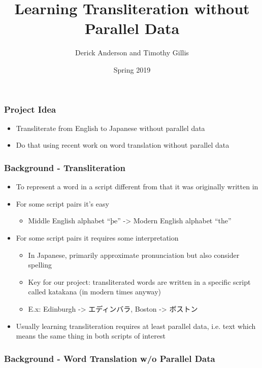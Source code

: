 \documentclass{beamer}
\title{Learning Transliteration without Parallel Data}
\author{Derick Anderson and Timothy Gillis}
\date{Spring 2019}
\begin{document}
 
\frame{\titlepage}
 
\begin{frame}
  \frametitle{Project Idea}

  \begin{itemize}
  \item Transliterate from English to Japanese without parallel data
  \item Do that using recent work on word translation without parallel data
  \end{itemize}

\end{frame}

\begin{frame}
  \frametitle{Background - Transliteration}

  \begin{itemize}
  \item To represent a word in a script different from that it was originally
    written in
  \item For some script pairs it's easy
    \begin{itemize}
      \item Middle English alphabet ``þe'' -> Modern English alphabet ``the''
    \end{itemize}

  \item For some script pairs it requires some interpretation
    \begin{itemize}
    \item In Japanese, primarily approximate pronunciation but also consider
      spelling
    \item Key for our project: transliterated words are written in a specific
      script called katakana (in modern times anyway)
    \item E.x: Edinburgh -> エディンバラ, Boston -> ボストン
    \end{itemize}

  \item Usually learning transliteration requires at least parallel data,
    i.e. text which means the same thing in both scripts of interest
  \end{itemize}

\end{frame}

\begin{frame}
  \frametitle{Background - Word Translation w/o Parallel Data}

\end{frame}
\end{document}
